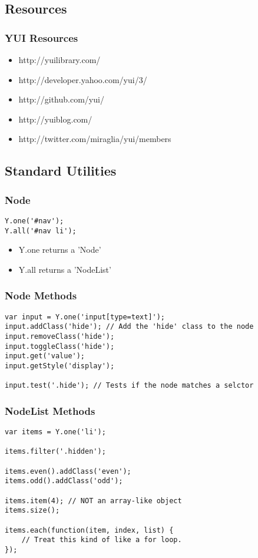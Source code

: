 \documentclass[t]{beamer}
\begin{document}
\subsection{Resources}
\begin{frame}
 \frametitle{YUI Resources}
 \begin{itemize}
  \item http://yuilibrary.com/
  \item http://developer.yahoo.com/yui/3/
  \item http://github.com/yui/
  \item http://yuiblog.com/
  \item http://twitter.com/miraglia/yui/members
 \end{itemize}
\end{frame}

\subsection{Standard Utilities}
\begin{frame}[fragile]
 \frametitle{Node}
 \begin{verbatim}
Y.one('#nav');
Y.all('#nav li');
 \end{verbatim}
 \begin{itemize}
  \item Y.one returns a 'Node'
  \item Y.all returns a 'NodeList'
 \end{itemize}
\end{frame}

\begin{frame}[fragile]
 \frametitle{Node Methods}
 \begin{verbatim}
var input = Y.one('input[type=text]');
input.addClass('hide'); // Add the 'hide' class to the node
input.removeClass('hide');
input.toggleClass('hide');
input.get('value');
input.getStyle('display');

input.test('.hide'); // Tests if the node matches a selctor
 \end{verbatim}
\end{frame}

\begin{frame}[fragile]
 \frametitle{NodeList Methods}
 \begin{verbatim}
var items = Y.one('li');

items.filter('.hidden');

items.even().addClass('even');
items.odd().addClass('odd');

items.item(4); // NOT an array-like object
items.size();

items.each(function(item, index, list) {
    // Treat this kind of like a for loop.
});
 \end{verbatim}
\end{frame}
\end{document}
